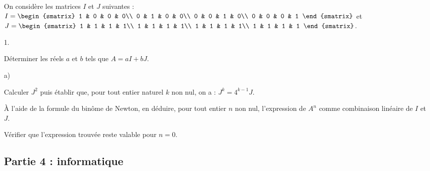 \documentclass[11pt]{article}%
\begin{document}
\noindent
On considère les matrices $I$ et $J$ suivantes : $I =
\begin{smatrix}
  1 & 0 & 0 & 0\\
  0 & 1 & 0 & 0\\
  0 & 0 & 1 & 0\\
  0 & 0 & 0 & 1
\end{smatrix}
$ et $J = 
\begin{smatrix}
  1 & 1 & 1 & 1\\
  1 & 1 & 1 & 1\\
  1 & 1 & 1 & 1\\
  1 & 1 & 1 & 1
\end{smatrix}
$.
\begin{noliste}{1.}
  \setlength{\itemsep}{4mm}%
  \setcounter{enumi}{8}
\item Déterminer les réels $a$ et $b$ tels que $A = aI + bJ$.

  

\item
  \begin{noliste}{a)}
    \setlength{\itemsep}{2mm}
  \item Calculer $J^{2}$ puis établir que, pour tout entier naturel
    $k$ non nul, on a : $J^{k} = 4^{k-1} J$.

    

  \item À l'aide de la formule du binôme de Newton, en déduire, pour
    tout entier $n$ non nul, l'expression de $A^{n}$ comme combinaison
    linéaire de $I$ et $J$.

    

  \item Vérifier que l'expression trouvée reste valable pour $n = 0$.

    
  \end{noliste}
\end{noliste}

\subsection*{Partie 4 : informatique}
\end{document}
